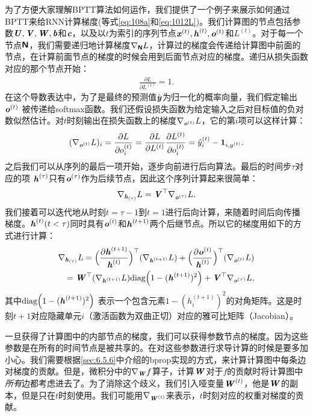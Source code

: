 为了方便大家理解BPTT算法如何运作，我们提供了一个例子来展示如何通过BPTT来给RNN计算梯度(等式\ref{eq:108a}和\ref{eq:1012L})。我们计算图的节点包括参数$\boldsymbol{\mathit{U}},\boldsymbol{\mathit{V}},\boldsymbol{\mathit{W}}, \boldsymbol{\mathit{b}}$和$\boldsymbol{\mathit{c}}$，以及以$t$为索引的序列节点$\boldsymbol{\mathit{x}}^{(t)}, \boldsymbol{\mathit{h}}^{(t)},\boldsymbol{\mathit{o}}^{(t)}$和$L^{(t)}$。对于每一个节点$\textsf{\textbf{N}}$，我们需要递归地计算梯度$\nabla_{\textsf{\textbf{N}}} L$，计算过的梯度会传递给计算图中前面的节点，在计算前面节点的梯度的时候会用到后面节点对应的梯度。递归从损失函数对应的那个节点开始：
\begin{align}
 \frac{\partial L}{\partial L^{(t)}} = 1.
\end{align}
在这个导数表达中，为了是最终的预测值$\hat{\boldsymbol{\mathit{y}}}$为归一化的概率向量，我们假定输出$\boldsymbol{\mathit{o}}^{(t)}$ 被传递给softmax函数。我们还假设损失函数为给定输入之后对目标值的负对数似然估计。对$t$时刻输出在损失函数上的梯度$\nabla_{\boldsymbol{\mathit{o}}^{(t)}} L$，它的第$i$项可以这样计算：
\begin{align}
 (\nabla_{\boldsymbol{\mathit{o}}^{(t)}} L)_i =  \frac{\partial L}{\partial o_i^{(t)}} 
 =  \frac{\partial L}{\partial L^{(t)}}  \frac{\partial L^{(t)}}{\partial o_i^{(t)}}  
 = \hat y_i^{(t)} - \mathbf{1}_{i,y^{(t)}}.
\end{align}
之后我们可以从序列的最后一项开始，逐步向前进行后向算法。最后的时间步$\tau$对应的项 $\boldsymbol{\mathit{h}}^{(\tau)}$只有$\boldsymbol{\mathit{o}}^{(\tau)}$作为后续节点，因此这个序列计算起来很简单：
\begin{align}
 \nabla_{\boldsymbol{\mathit{h}}_{(\tau)}} L = \boldsymbol{\mathit{V}}^\top \nabla_{\boldsymbol{\mathit{o}}^{(\tau)}} L.
\end{align}
我们接着可以迭代地从时刻$t=\tau-1$到$t=1$进行后向计算，来随着时间后向传播梯度。$\boldsymbol{\mathit{h}}^{(t)}(t < \tau)$同时具有$\boldsymbol{\mathit{o}}^{(t)}$和$\boldsymbol{\mathit{h}}^{(t+1)}$两个后继节点。所以它的梯度用如下的方式进行计算：
\begin{align}
  \nabla_{\boldsymbol{\mathit{h}}_{(\tau)}} L = \Big( \frac{\partial \boldsymbol{\mathit{h}}^{(t+1)}}{ \boldsymbol{\mathit{h}}^{(t)}}  \Big)^\top(\nabla_{\boldsymbol{\mathit{h}}^{(t+1)}} L) 
  + \Big( \frac{\partial \boldsymbol{\mathit{o}}^{(t)}}{ \boldsymbol{\mathit{h}}^{(t)}}  \Big)^\top (\nabla_{\boldsymbol{\mathit{o}}^{(t)}} L) \\
  = \boldsymbol{\mathit{W}}^\top (\nabla_{\boldsymbol{\mathit{h}}^{(t+1)}} L) \text{diag} \Big( 1 - (\boldsymbol{\mathit{h}}^{(t+1)})^2 \Big) 
  + \boldsymbol{\mathit{V}}^\top \nabla_{\boldsymbol{\mathit{o}}^{(\tau)}} L,
\end{align}
其中$\text{diag} \Big( 1 - (\boldsymbol{\mathit{h}}^{(t+1)})^2 \Big) $ 表示一个包含元素$1 - (h_i^{(t+1)})^2$的对角矩阵。这是时刻$t+1$对应隐藏单元$i$（激活函数为双曲正切）对应的雅可比矩阵（Jacobian）。

一旦获得了计算图中的内部节点的梯度，我们可以获得参数节点的梯度。因为这些参数是在所有的时间节点是被共享的。在对这些参数进行求导计算的时候是要多加小心。我们需要根据\ref{sec:6.5.6}中介绍的bprop实现的方式，来计算计算图中每条边对梯度的贡献。但是，微积分中的$\nabla_{\boldsymbol{\mathit{W}}} f$算子，计算$\boldsymbol{\mathit{W}}$对于$f$的贡献时将计算图中\emph{所有}边都考虑进去了。为了消除这个歧义，我们引入哑变量$\boldsymbol{\mathit{W}}^{(t)}$，他是$\boldsymbol{\mathit{W}}$的副本，但是只在$t$时刻使用。我们可能用$\nabla_{\boldsymbol{\mathit{W}}^{(t)}}$来表示，$t$时刻对应的权重对梯度的贡献。

